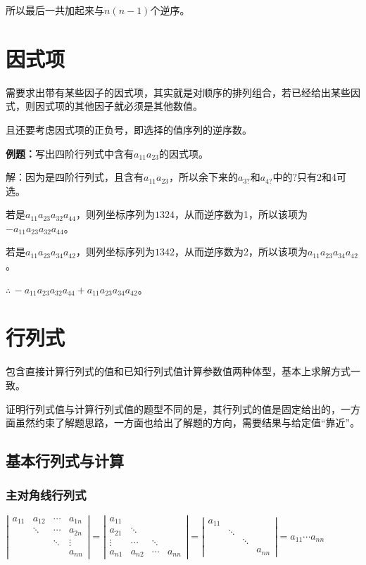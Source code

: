 所以最后一共加起来与$n(n-1)$个逆序。

\section{因式项}

需要求出带有某些因子的因式项，其实就是对顺序的排列组合，若已经给出某些因式，则因式项的其他因子就必须是其他数值。

且还要考虑因式项的正负号，即选择的值序列的逆序数。

\textbf{例题：}写出四阶行列式中含有$a_{11}a_{23}$的因式项。

解：因为是四阶行列式，且含有$a_{11}a_{23}$，所以余下来的$a_{3?}$和$a_{4?}$中的$?$只有2和4可选。

若是$a_{11}a_{23}a_{32}a_{44}$，则列坐标序列为$1324$，从而逆序数为1，所以该项为$-a_{11}a_{23}a_{32}a_{44}$。

若是$a_{11}a_{23}a_{34}a_{42}$，则列坐标序列为$1342$，从而逆序数为2，所以该项为$a_{11}a_{23}a_{34}a_{42}$。

$\therefore\,-a_{11}a_{23}a_{32}a_{44}+a_{11}a_{23}a_{34}a_{42}$。

\section{行列式}

包含直接计算行列式的值和已知行列式值计算参数值两种体型，基本上求解方式一致。

证明行列式值与计算行列式值的题型不同的是，其行列式的值是固定给出的，一方面虽然约束了解题思路，一方面也给出了解题的方向，需要结果与给定值“靠近”。

\subsection{基本行列式与计算}

\subsubsection{主对角线行列式}

$\left|\begin{array}{cccc} 
    a_{11} & a_{12} & \cdots & a_{1n} \\
     & \ddots & \cdots & a_{2n} \\
     & & \ddots & \vdots  \\
     & & & a_{nn}
\end{array}\right|=
\left|\begin{array}{cccc} 
    a_{11} & & & \\
    a_{21} & \ddots & & \\
    \vdots & \cdots & \ddots &  \\
    a_{n1} & a_{n2} & \cdots & a_{nn}
\end{array}\right|=
\left|\begin{array}{cccc} 
    a_{11} & & & \\
     & \ddots & & \\
     & & \ddots &  \\
     & & & a_{nn}
\end{array}\right|=a_{11}\cdots a_{nn}$

